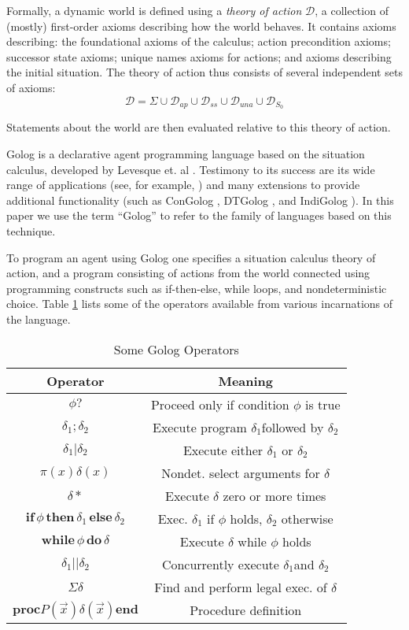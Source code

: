 \documentclass[letterpaper]{article}
\begin{document}
Formally, a dynamic world is defined using a \emph{theory of action}
$\mathcal{D}$, a collection of (mostly) first-order axioms describing
how the world behaves. It contains axioms describing: the foundational
axioms of the calculus; action precondition axioms; successor state
axioms; unique names axioms for actions; and axioms describing the
initial situation. The theory of action thus consists of several independent
sets of axioms:
\begin{equation}
\mathcal{D}=\Sigma\cup\mathcal{D}_{ap}\cup\mathcal{D}_{ss}\cup\mathcal{D}_{una}\cup\mathcal{D}_{S_{0}}
\end{equation}


Statements about the world are then evaluated relative to this theory
of action.

Golog is a declarative agent programming language based on the situation
calculus, developed by Levesque et. al \cite{levesque97golog}. Testimony
to its success are its wide range of applications (see, for example,
\cite{levesque97golog,Ferrein2005readylog} ) and many extensions
to provide additional functionality (such as ConGolog \cite{giacomo00congolog},
DTGolog \cite{boutilier00dtgolog}, and IndiGolog \cite{giacomo99indigolog}).
In this paper we use the term ``Golog'' to refer to the family
of languages based on this technique.

To program an agent using Golog one specifies a situation calculus
theory of action, and a program consisting of actions from the world
connected using programming constructs such as if-then-else, while
loops, and nondeterministic choice. Table \ref{tbl:Golog-Operators}
lists some of the operators available from various incarnations of
the language.

\begin{table}[hbt]
\begin{center}\begin{tabular}{|c|c|}
\hline 
Operator&
Meaning\tabularnewline
\hline
\hline 
$\phi?$&
Proceed only if condition $\phi$ is true\tabularnewline
\hline 
$\delta_{1};\delta_{2}$&
Execute program $\delta_{1}$followed by $\delta_{2}$\tabularnewline
\hline 
$\delta_{1}|\delta_{2}$&
Execute either $\delta_{1}$ or $\delta_{2}$\tabularnewline
\hline 
$\pi(x)\delta(x)$&
Nondet. select arguments for $\delta$\tabularnewline
\hline 
$\delta*$&
Execute $\delta$ zero or more times\tabularnewline
\hline 
$\mathbf{if}\,\phi\,\mathbf{then}\,\delta_{1}\,\mathbf{else}\,\delta_{2}$&
Exec. $\delta_{1}$ if $\phi$ holds, $\delta_{2}$ otherwise\tabularnewline
\hline 
$\mathbf{while\,}\phi\mathbf{\, do}\,\delta$&
Execute $\delta$ while $\phi$ holds\tabularnewline
\hline 
$\delta_{1}||\delta_{2}$&
Concurrently execute $\delta_{1}$and $\delta_{2}$\tabularnewline
\hline 
$\Sigma\delta$&
Find and perform legal exec. of $\delta$\tabularnewline
\hline 
$\mathbf{proc}P(\overrightarrow{x})\delta(\overrightarrow{x})\mathbf{end}$&
Procedure definition\tabularnewline
\hline
\end{tabular}\end{center}


\caption{Some Golog Operators\label{tbl:Golog-Operators}}
\end{table}
\end{document}
